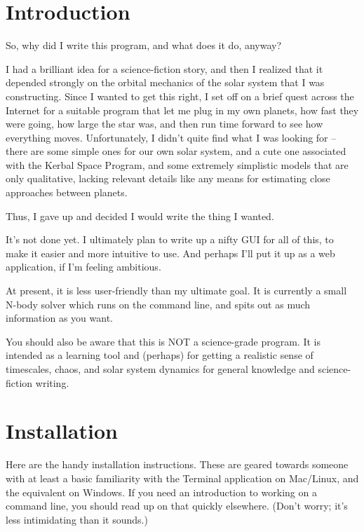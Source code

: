 \documentclass{article}
\begin{document}
\tableofcontents

\section{Introduction}

So, why did I write this program, and what does it do, anyway?

I had a brilliant idea for a science-fiction story, and then I realized that it depended strongly on the orbital mechanics of the solar system that I was constructing.  Since I wanted to get this right, I set off on a brief quest across the Internet for a suitable program that let me plug in my own planets, how fast they were going, how large the star was, and then run time forward to see how everything moves.  Unfortunately, I didn't quite find what I was looking for -- there are some simple ones for our own solar system, and a cute one associated with the Kerbal Space Program, and some extremely simplistic models that are only qualitative, lacking relevant details like any means for estimating close approaches between planets.

Thus, I gave up and decided I would write the thing I wanted.

It's not done yet.  I ultimately plan to write up a nifty GUI for all of this, to make it easier and more intuitive to use.  And perhaps I'll put it up as a web application, if I'm feeling ambitious.

At present, it is less user-friendly than my ultimate goal.  It is currently a small N-body solver which runs on the command line, and spits out as much information as you want.

You should also be aware that this is NOT a science-grade program.  It is intended as a learning tool and (perhaps) for getting a realistic sense of timescales, chaos, and solar system dynamics for general knowledge and science-fiction writing.

\section{Installation}

Here are the handy installation instructions.  These are geared towards someone with at least a basic familiarity with the Terminal application on Mac/Linux, and the equivalent on Windows.  If you need an introduction to working on a command line, you should read up on that quickly elsewhere.  (Don't worry; it's less intimidating than it sounds.)
\end{document}

